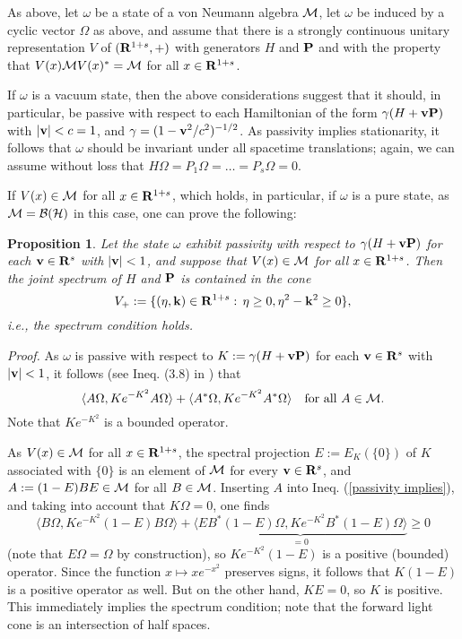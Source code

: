 \documentclass[a4paper,11pt]{article}
\newtheorem{proposition}[theorem]{Proposition}{\bf}{\it}
\renewcommand{\forall}{\mbox{for all}\,\,}
\def\dt{\cal}
\def\dB{{\dt B}}
\def\dM{{\dt M}}
\def\H{{\cal H}}
\def\gO{\Omega}
\def\go{\omega}
\def\Rd{\reals^{1+s}}
\def\reals{{\bf R}}
\begin{document}
As above, let $\go$ be a state of a von Neumann algebra $\dM$, let
$\go$ be induced by a cyclic vector $\gO$ as above, and assume
that there is a strongly continuous
unitary representation $V$ of $(\Rd,+)$ with generators $H$ and
${\bf P}$ and with the property that
$V(x)\dM V(x)^*=\dM$ for all $x\in\Rd$.

If $\go$ is a vacuum state, then the above considerations
suggest that it should, in particular, be passive with respect to
each Hamiltonian of the form
$\gamma(H+{\bf v}{\bf P})$ with
$|{\bf v}|<c=1$, and
$\gamma=(1-{\bf v}^2/c^2)^{-1/2}$.
As passivity implies stationarity, it follows that
$\go$ should be invariant under all spacetime translations;
again, we can assume without loss that $H\gO=P_1\gO=\dots=P_s\gO=0$.

If $V(x)\in\dM$ for all $x\in\Rd$, which holds, in particular, if $\go$
is a pure state, as $\dM=\dB(\H)$ in this case, one
can prove the following:

\begin{proposition}\label{positive}
Let the state $\go$ exhibit passivity with respect to
$\gamma(H+{\bf v}{\bf P})$ for each ${\bf v}\in\reals^s$ with
$|{\bf v}|<1$, and suppose that $V(x)\in\dM$ for all $x\in\Rd$. Then
the joint spectrum of $H$ and ${\bf P}$ is contained in the cone
$$V_+:=\{(\eta,{\bf k})\in\Rd:\,\eta\geq0,\eta^2-{\bf k}^2\geq0\},$$
i.e., the spectrum condition holds.
\end{proposition}

{\it Proof.}
As $\go$ is passive with respect to $K:=\gamma(H+{\bf vP})$ for each
${\bf v}\in\reals^s$ with $|{\bf v}|<1$, it follows
(see Ineq. (3.8) in \cite{PW78}) that
\begin{equation}\label{passivity implies}
\langle A\gO,Ke^{-K^2}A\gO\rangle+\langle A^*\gO,Ke^{-K^2}A^*\gO\rangle
\quad\forall A\in\dM.
\end{equation}
Note that $Ke^{-K^2}$ is a bounded operator.

As $V(x)\in\dM$ for all $x\in\Rd$, the spectral
projection $E:=E_K(\{0\})$ of
$K$ associated with $\{0\}$ is an element of $\dM$
for every ${\bf v}\in\reals^s$, and
$A:=(1-E)BE\in\dM$ for all $B\in\dM$.
Inserting $A$ into Ineq. (\ref{passivity
implies}), and taking into account that $K\gO=0$, one finds
\begin{equation}\label{passivity implies more}
\langle B\gO,Ke^{-K^2}(1-E)B\gO\rangle+\underbrace{\langle E B^*(1-E)\gO,
Ke^{-K^2}B^*(1-E)\gO\rangle}_{=0}\geq0
\end{equation}
(note that $E\gO=\gO$ by construction),
so $Ke^{-K^2}(1-E)$ is a positive (bounded)
operator.
Since the function $x\mapsto xe^{-x^2}$ preserves signs,
it follows that $K(1-E)$ is a positive operator as well.
But on the other hand, $KE=0$, so $K$ is positive.
This immediately implies the spectrum condition;
note that the forward light cone is an intersection of
half spaces.
\end{document}
